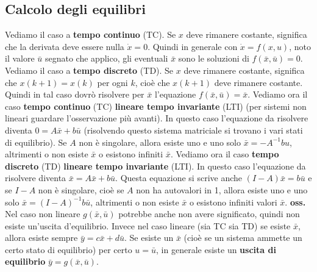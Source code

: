 \subsection{Calcolo degli equilibri}
Vediamo il caso a \textbf{tempo continuo} (TC). Se $x$ deve rimanere costante, significa che la derivata deve essere nulla $\dot{x} = 0$. Quindi in generale con $\dot{x} = f(x,u)$, noto il valore $\bar{u}$ segnato che applico, gli eventuali $\bar{x}$ sono le soluzioni di $f(\bar{x}, \bar{u}) = 0$.\newline
\newline
Vediamo il caso a \textbf{tempo discreto} (TD). Se $x$ deve rimanere costante, significa che $x(k+1) = x(k)$ per ogni $k$, cioè che $x(k+1)$ deve rimanere costante. Quindi in tal caso dovrò risolvere per $\bar{x}$ l'equazione $f(\bar{x}, \bar{u}) = \bar{x}$.\newline
\newline
Vediamo ora il caso \textbf{tempo continuo} (TC) \textbf{lineare tempo invariante} (LTI) (per sistemi non lineari guardare l'osservazione più avanti). In questo caso l'equazione da risolvere diventa $0 = A \bar{x} + b \bar{u}$ (risolvendo questo sistema matriciale si trovano i vari stati di equilibrio). Se $A$ non è singolare, allora esiste uno e uno solo $\bar{x} = -A^{-1} b u$, altrimenti o non esiste $\bar{x}$ o esistono infiniti $\bar{x}$.\newline
\newline
Vediamo ora il caso \textbf{tempo discreto} (TD) \textbf{lineare tempo invariante} (LTI). In questo caso l'equazione da risolvere diventa $\bar{x} = A \bar{x} + b \bar{u}$. Questa equazione si scrive anche $(I-A)\bar{x} = b \bar{u}$ e se $I-A$ non è singolare, cioè se $A$ non ha autovalori in 1, allora esiste uno e uno solo $\bar{x} = (I-A)^{-1} b \bar{u}$, altrimenti o non esiste $\bar{x}$ o esistono infiniti valori $\bar{x}$.\newline
\newline
\textbf{oss.} Nel caso non lineare $g(\bar{x}, \bar{u})$ potrebbe anche non avere significato, quindi non esiste un'uscita d'equilibrio. Invece nel caso lineare (sia TC sia TD) se esiste $\bar{x}$, allora esiste sempre $\bar{y} = c \bar{x} + d \bar{u}$.\newline
\newline
Se esiste un $\bar{x}$ (cioè se un sistema ammette un certo stato di equilibrio) per certo $u = \bar{u}$, in generale esiste un \textbf{uscita di equilibrio} $\bar{y} = g(\bar{x}, \bar{u})$.
